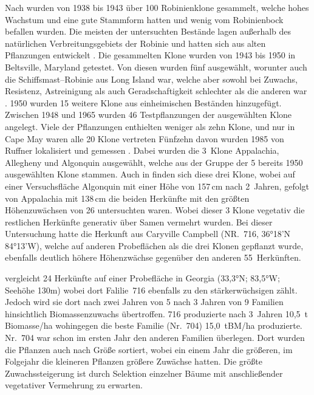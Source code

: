 \documentclass[twocolumn]{scrartcl}
\begin{document}
Nach \citet{santamour1970robinie,steinergroup1987robinie} wurden von 1938 bis 1943 über 100
Robinienklone gesammelt, welche hohes Wachstum und eine gute Stammform hatten
und wenig vom Robinienbock befallen wurden. Die meisten der untersuchten
Bestände lagen außerhalb des natürlichen Verbreitungsgebiets der Robinie und
hatten sich aus alten Pflanzungen entwickelt \citep{hopp1941robinie}. Die
gesammelten Klone wurden von 1943 bis 1950 in Beltsville, Maryland getestet. Von
diesen wurden fünf ausgewählt, worunter auch die Schiffsmast--Robinie aus Long
Island war, welche aber sowohl bei Zuwachs, Resistenz, Astreinigung als auch
Geradschaftigkeit schlechter als die anderen war \citep{santamour1960robinie}.
1950 wurden 15 weitere Klone aus einheimischen Beständen hinzugefügt.
Zwischen 1948 und 1965 wurden 46 Testpflanzungen der ausgewählten
Klone angelegt. Viele der Pflanzungen enthielten weniger als zehn Klone,
und nur in Cape May waren alle 20 Klone vertreten Fünfzehn davon wurden
1985 von Ruffner lokalisiert und gemessen \citep{bongarten1992robinie}.
Dabei wurden die 3~Klone Appalachia, Allegheny und Algonquin ausgewählt,
welche aus der Gruppe der 5 bereits 1950 ausgewählten Klone stammen.
Auch in \citet{bridgen1988robinie} finden sich diese drei Klone, wobei
auf einer Versuchsfläche Algonquin mit einer Höhe von 157\,cm nach 2~Jahren,
gefolgt von Appalachia mit 138\,cm die beiden Herkünfte mit den größten
Höhenzuwächsen von 26 untersuchten waren. Wobei dieser 3 Klone vegetativ
die restlichen Herkünfte generativ über Samen vermehrt wurden. Bei dieser
Untersuchung hatte die Herkunft aus Caryville Campbell
(NR.\ 716, 36°18'N 84°13'W), welche
auf anderen Probeflächen als die drei Klonen gepflanzt wurde, ebenfalls
deutlich höhere Höhenzwächse gegenüber den anderen 55~Herkünften.

\citet{bongarten1992robineSelektion} vergleicht 24 Herkünfte auf einer
Probefläche in Georgia (33,3°N; 83,5°W; Seehöhe 130m) wobei dort
Falilie~716 ebenfalls zu den stärkerwüchsigen zählt. Jedoch wird sie
dort nach zwei Jahren von 5 nach 3 Jahren von 9 Familien hinsichtlich
Biomassenzuwachs übertroffen. 716 produzierte nach 3~Jahren 10,5~t
Biomasse/ha wohingegen die beste Familie (Nr.~704) 15,0~tBM/ha
produzierte. Nr.~704 war schon im ersten Jahr den anderen Familien
überlegen.  Dort wurden die Pflanzen auch nach Größe sortiert, wobei
ein einem Jahr die größeren, im Folgejahr die kleineren Pflanzen
größere Zuwächse hatten. Die größte Zuwachssteigerung ist durch Selektion
einzelner Bäume mit anschließender vegetativer Vermehrung zu erwarten.
\end{document}
